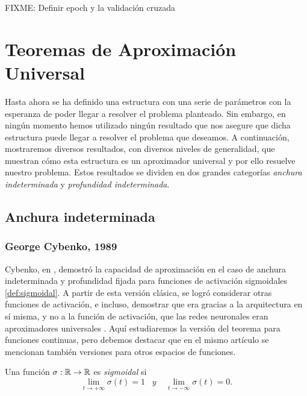 FIXME: Definir epoch y la validación cruzada

\chapter{Teoremas de Aproximación Universal}
Hasta ahora se ha definido una estructura con una serie de parámetros con la esperanza de poder llegar a resolver el problema planteado. Sin embargo, en ningún momento hemos utilizado ningún resultado que nos asegure que dicha estructura puede llegar a resolver el problema que deseamos. A continuación, mostraremos diversos resultados, con diversos niveles de generalidad, que muestran cómo esta estructura es un aproximador universal y por ello resuelve nuestro problema. Estos resultados se dividen en dos grandes categorías \emph{anchura indeterminada} y \emph{profundidad indeterminada}.

\section{Anchura indeterminada}
\subsection{George Cybenko, 1989}
Cybenko, en \cite{cybenko1989approximation}, demostró la capacidad de aproximación en el caso de anchura indeterminada y profundidad fijada para funciones de activación sigmoidales \autoref{def:sigmoidal}. A partir de esta versión clásica, se logró considerar otras funciones de activación, e incluso, demostrar que era gracias a la arquitectura en sí misma, y no a la función de activación, que las redes neuronales eran aproximadores universales \cite{Kurt1991251}. Aquí estudiaremos la versión del teorema para funciones continuas, pero debemos destacar que en el mismo artículo se mencionan también versiones para otros espacios de funciones.
\begin{definicion}\label{def:sigmoidal}
Una función $\sigma : \mathbb{R} \to \mathbb{R}$ es \emph{sigmoidal} si $$\lim_{t\to +\infty} \sigma(t)=1 \;\;\; y \;\;\;\; \lim_{t\to -\infty} \sigma(t)=0.$$
\end{definicion}\\

